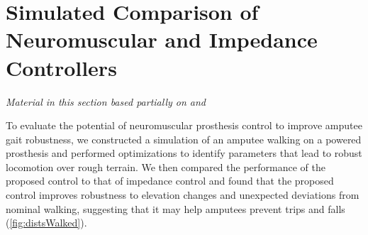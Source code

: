 \chapter{Simulated Comparison of Neuromuscular and Impedance
Controllers}\label{sec:control_sim}

\graphicspath{{chapters/control_simulation/figures/}}

\emph{Material in this section based partially on
\citet{thatte2016toward}\cite{thatte2016toward} and
\citet{thatte2014towards}\cite[0.25in]{thatte2014towards}} \linebreak

To evaluate the potential of neuromuscular prosthesis control to improve amputee
gait robustness, we constructed a simulation of an amputee walking on a powered
prosthesis and performed optimizations to identify parameters that lead to
robust locomotion over rough terrain. We then compared the performance of the
proposed control to that of impedance control and found that the proposed control
improves robustness to elevation changes and unexpected deviations from nominal
walking, suggesting that it may help amputees prevent trips and falls
(\cref{fig:distsWalked}).




